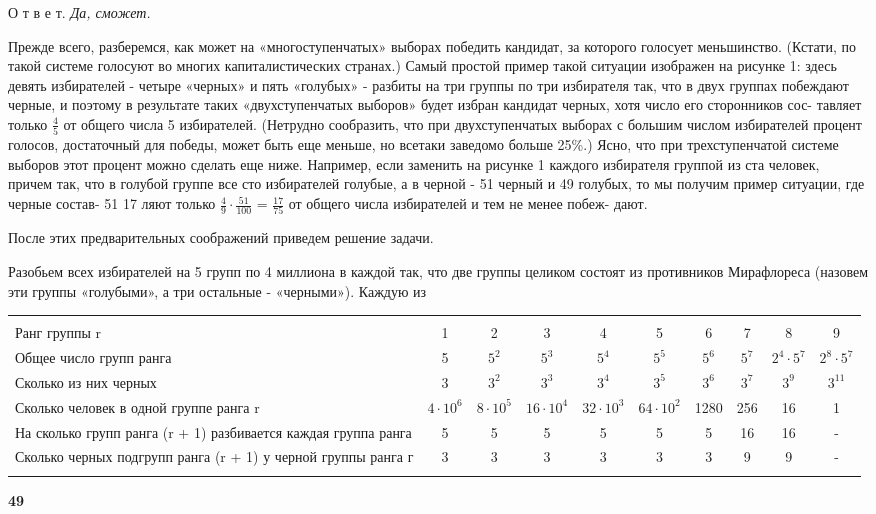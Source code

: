 \documentclass{article}
\begin{document}
\begin{multicols}{2}
		\par
		О т в е т. \emph{Да, сможет.}
		\par 
		Прежде всего, разберемся, как может на «многоступенчатых» выборах
		победить кандидат, за которого голосует меньшинство. (Кстати, по такой системе голосуют во многих капиталистических странах.) Самый простой пример такой ситуации изображен на рисунке 1: здесь девять избирателей - четыре «черных» и пять «голубых» - разбиты на три группы по три избирателя так, что в двух группах побеждают черные, и поэтому в результате таких «двухступенчатых выборов» будет избран кандидат черных, хотя число его сторонников сос-
		тавляет только \Large{$\frac{4}{5}$} от общего числа 5
		избирателей. (Нетрудно сообразить, что при двухступенчатых выборах с большим числом избирателей процент голосов, достаточный для победы, может быть еще меньше, но всетаки заведомо больше 25\%.) Ясно, что при трехступенчатой системе выборов этот процент можно сделать еще ниже. Например, если заменить на рисунке 1 каждого избирателя группой из ста человек, причем так, что в голубой группе все сто избирателей голубые, а в черной - 51 черный и 49 голубых, то мы получим пример ситуации, где черные состав- 51 17 ляют только \Large{$\frac{4}{9} \cdot \frac{51}{100}$ = $\frac{17}{75}$}  от общего числа избирателей и тем не менее побеж-
		дают.
		\par
		После этих предварительных соображений приведем решение задачи. 
		\par
		Разобьем всех избирателей на 5 групп по 4 миллиона в каждой так, что две группы целиком состоят из противников Мирафлореса (назовем эти группы «голубыми», а три остальные - «черными»). Каждую из
	\end{multicols}
	
	
	
	\hspace{-15px}\begin{tabular}{p{6cm} C C C C C C C C C}
		\hline
		&&&&&&&&&\\
		Ранг группы r & 1 & 2 & 3 & 4 & 5 & 6 & 7 & 8 & 9\\
		Общее число групп ранга & 5 & $5^2$ & $5^3$ & $5^4$ & $5^5$ & $5^6$ & $5^7$ & $2^4 \cdot 5^7$ & $2^8 \cdot 5^7$\\
		Сколько из них черных & 3 & $3^2$ & $3^3$ & $3^4$ & $3^5$ & $3^6$ & $3^7$ & $3^9$ & $3^11$\\
		Сколько человек в одной группе ранга r & $4 \cdot 10^6$ & $8 \cdot 10^5$ & $16 \cdot 10^4$ & $32 \cdot 10^3$ & $64 \cdot 10^2$ & 1280 &256 & 16 & 1\\
		На сколько групп ранга (r + 1) разбивается каждая группа ранга & 5 & 5 & 5 & 5 & 5 & 5 & 16 & 16 & - \\
		Сколько черных подгрупп ранга (r + 1) у черной группы ранга г & 3 & 3 & 3 & 3 & 3 & 3 & 9 & 9 & - \\
		&&&&&&&&&\\
		\hline
		
	\end{tabular}
	\begin{flushright}
		\textbf{49}
	\end{flushright}
	
\end{document}
